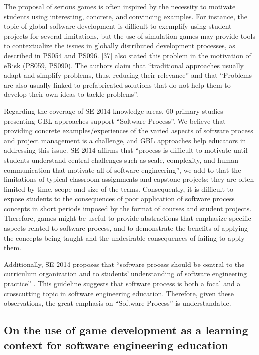 The proposal of serious games is often inspired by the necessity to motivate students using interesting, concrete, and convincing examples. For instance, the topic of global software development is difficult to exemplify using student projects for several limitations, but the use of simulation games may provide tools to contextualize the issues in globally distributed development processes, as described in PS054 and PS096.  \cite{Oliveira:2013}[37] also stated this problem in the motivation of eRisk (PS059, PS090). The authors claim that “traditional approaches usually adapt and simplify problems, thus, reducing their relevance” and that “Problems are also usually linked to prefabricated solutions that do not help them to develop their own ideas to tackle problems”.

Regarding the coverage of SE 2014 knowledge areas, 60 primary studies presenting GBL approaches support “Software Process”. We believe that providing concrete examples/experiences of the varied aspects of software process and project management is a challenge, and GBL approaches help educators in addressing this issue. SE 2014 \citep{Acm:2015} affirms that “process is difficult to motivate until students understand central challenges such as scale, complexity, and human communication that motivate all of software engineering”, we add to that the limitations of typical classroom assignments and capstone projects: they are often limited by time, scope and size of the teams. Consequently, it is difficult to expose students to the consequences of poor application of software process concepts in short periods imposed by the format of courses and student projects. Therefore, games might be useful to provide abstractions that emphasize specific aspects related to software process, and to demonstrate the benefits of applying the concepts being taught and the undesirable consequences of failing to apply them.

Additionally, SE 2014 proposes that “software process should be central to the curriculum organization and to students’ understanding of software engineering practice” \citep{Acm:2015}. This guideline suggests that software process is both a focal and a crosscutting topic in software engineering education. Therefore, given these observations, the great emphasis on “Software Process” is understandable.

\subsection{On the use of game development as a learning context for software engineering education}
\label{sec:smsdiscussiongdbl}

